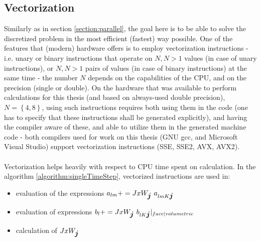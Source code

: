 \subsection{Vectorization}
Similarly as in section \cref{section:parallel}, the goal here is to be able to solve the discretized problem in the most efficient (fastest) way possible. One of the features that (modern) hardware offers is to employ vectorization instructions - i.e. unary or binary instructions that operate on $N, N > 1$ values (in case of unary instructions), or $N, N > 1$ pairs of values (in case of binary instructions) at the same time - the number $N$ depends on the capabilities of the CPU, and on the precision (single or double). On the hardware that was available to perform calculations for this thesis (and based on always-used double precision), $N = \left\{4, 8\right\}$, using such instructions requires both using them in the code (one has to specify that these instructions shall be generated explicitly), and having the compiler aware of these, and able to utilize them in the generated machine code - both compilers used for work on this thesis (GNU gcc, and Microsoft Visual Studio) support vectorization instructions (SSE, SSE2, AVX, AVX2).
\paragraph{}
Vectorization helps heavily with respect to CPU time spent on calculation. In the algorithm \cref{algorithm:singleTimeStep}, vectorized instructions are used in:
\begin{itemize}
    \item evaluation of the expressions $a_{lm} += JxW_{\mbox{\boldmath $j$}} \ a_{lm K \mbox{\boldmath $j$}}$
    \item evaluation of expressions $b_{l} += JxW_{\mbox{\boldmath $j$}} \ b_{l K \mbox{\boldmath $j$}}|_{face|volumetric}$
    \item calculation of $JxW_{\mbox{\boldmath $j$}}$
\end{itemize}